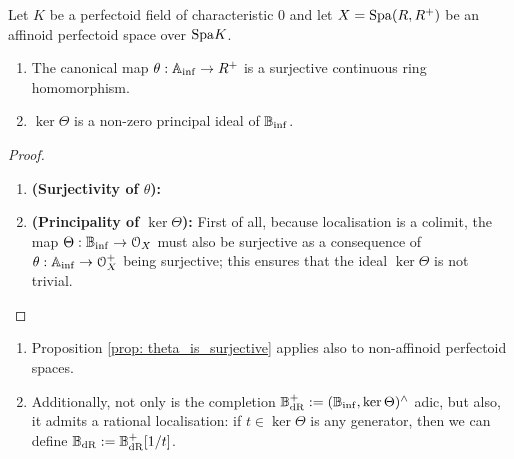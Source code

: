                     \begin{proposition} \label{prop: theta_is_surjective}
                        Let $K$ be a perfectoid field of characteristic $0$ and let $X = \mathrm{Spa}(R, R^+)$ be an affinoid perfectoid space over $\mathrm{Spa} K$.
                        \begin{enumerate}
                            \item The canonical map $\theta: \mathbb{A}_{\inf} \to R^+$ is a surjective continuous ring homomorphism.
                            \item $\ker \Theta$ is a non-zero principal ideal of $\mathbb{B}_{\inf}$.
                        \end{enumerate}
                    \end{proposition}
                        \begin{proof}
                            \noindent
                            \begin{enumerate}
                                \item \textbf{(Surjectivity of $\theta$):} 
                                \item \textbf{(Principality of $\ker \Theta$):} First of all, because localisation is a colimit, the map $\Theta: \mathbb{B}_{\inf} \to \mathcal{O}_X$ must also be surjective as a consequence of $\theta: \mathbb{A}_{\inf} \to \mathcal{O}_X^+$ being surjective; this ensures that the ideal $\ker \Theta$ is not trivial.
                            \end{enumerate}
                        \end{proof}
                    \begin{corollary} \label{coro: rational_de_rham_period_rings}
                        \noindent
                        \begin{enumerate}
                            \item Proposition \ref{prop: theta_is_surjective} applies also to non-affinoid perfectoid spaces.
                            \item Additionally, not only is the completion $\mathbb{B}_{\mathrm{dR}}^+ := (\mathbb{B}_{\inf}, \ker \Theta)^{\wedge}$ adic, but also, it admits a rational localisation: if $t \in \ker \Theta$ is any generator, then we can define $\mathbb{B}_{\mathrm{dR}} := \mathbb{B}_{\mathrm{dR}}^+[1/t]$. 
                        \end{enumerate}
                    \end{corollary}
                    
